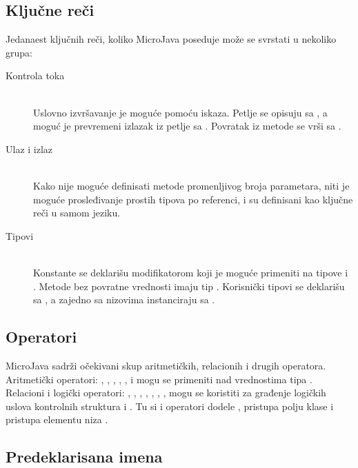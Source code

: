 \subsection*{Ključne reči}

Jedanaest ključnih reči, koliko MicroJava poseduje može se svrstati u nekoliko grupa:

\begin{description}
    \item[Kontrola toka] \hfill \\
    Uslovno izvršavanje je moguće pomoću  iskaza. 
    Petlje se opisuju sa , a moguć je prevremeni izlazak iz petlje sa . 
    Povratak iz metode se vrši sa .

   \item[Ulaz i izlaz] \hfill \\
	Kako nije moguće definisati metode promenljivog broja parametara, niti je moguće prosleđivanje prostih tipova po referenci,  i  su definisani kao ključne reči u samom jeziku.

	\item[Tipovi] \hfill \\
	Konstante se deklarišu modifikatorom  koji je moguće primeniti na tipove  i .
	Metode bez povratne vrednosti imaju tip . 
	Korisnički tipovi se deklarišu sa , a zajedno sa nizovima instanciraju sa .

\end{description}


\subsection*{Operatori}

MicroJava sadrži očekivani skup aritmetičkih, relacionih i drugih operatora.
Aritmetički operatori: \mj{+}, \mj{-}, \mj{*}, \mj{\%}, \mj{/}, \mj{++} i \mj{--} mogu se primeniti nad vrednostima tipa .
Relacioni i logički operatori: \mj{==}, \mj{>}, \mj{<}, \mj{>=}, \mj{<=}, \mj{!=}, \mj{\&\&}, \mj{||} mogu se koristiti za građenje logičkih uslova kontrolnih struktura  i .
Tu si i operatori dodele \mj{=}, pristupa polju klase  i pristupa elementu niza \mj{[]}.

\subsection*{Predeklarisana imena}

